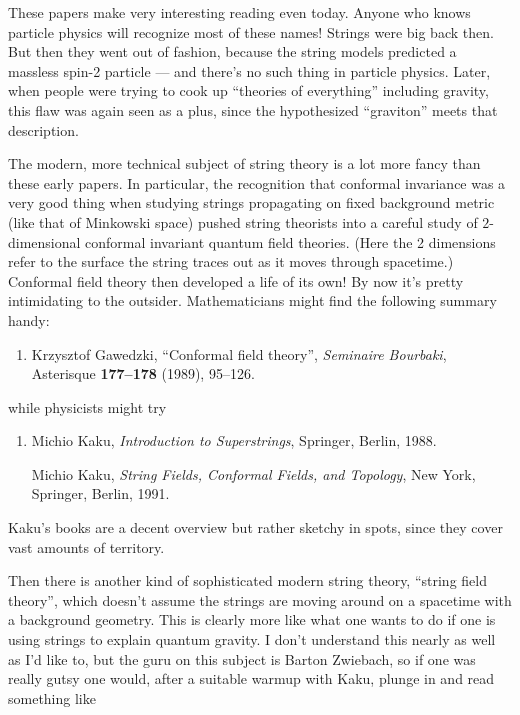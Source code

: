 \documentclass[12pt]{article}
\def\tightlist{}
\begin{document}
These papers make very interesting reading even today. Anyone who knows
particle physics will recognize most of these names! Strings were big
back then. But then they went out of fashion, because the string models
predicted a massless spin-2 particle --- and there's no such thing in
particle physics. Later, when people were trying to cook up ``theories
of everything'' including gravity, this flaw was again seen as a plus,
since the hypothesized ``graviton'' meets that description.

The modern, more technical subject of string theory is a lot more fancy
than these early papers. In particular, the recognition that conformal
invariance was a very good thing when studying strings propagating on
fixed background metric (like that of Minkowski space) pushed string
theorists into a careful study of \(2\)-dimensional conformal invariant
quantum field theories. (Here the 2 dimensions refer to the surface the
string traces out as it moves through spacetime.) Conformal field theory
then developed a life of its own! By now it's pretty intimidating to the
outsider. Mathematicians might find the following summary handy:

\begin{enumerate}
\def\labelenumi{\arabic{enumi})}
\setcounter{enumi}{1}
\tightlist
\item
  Krzysztof Gawedzki, ``Conformal field theory'', \emph{Seminaire
  Bourbaki}, Asterisque \textbf{177--178} (1989), 95--126.
\end{enumerate}
\noindent
while physicists might try

\begin{enumerate}
\def\labelenumi{\arabic{enumi})}
\setcounter{enumi}{2}
\item
  Michio Kaku, \emph{Introduction to Superstrings},
  Springer, Berlin, 1988.

   Michio Kaku, \emph{String Fields, Conformal Fields, and Topology}, 
  New York, Springer, Berlin, 1991.
\end{enumerate}
\noindent
Kaku's books are a decent overview but rather sketchy in spots, since
they cover vast amounts of territory.

Then there is another kind of sophisticated modern string theory,
``string field theory'', which doesn't assume the strings are moving
around on a spacetime with a background geometry. This is clearly more
like what one wants to do if one is using strings to explain quantum
gravity. I don't understand this nearly as well as I'd like to, but the
guru on this subject is Barton Zwiebach, so if one was really gutsy one
would, after a suitable warmup with Kaku, plunge in and read something
like
\end{document}
